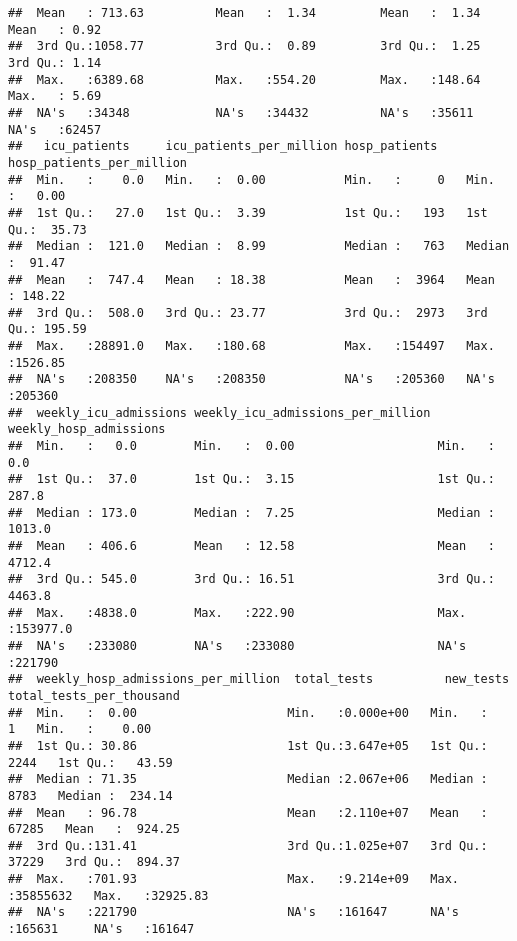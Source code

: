 \documentclass[
]{article}
\begin{document}
\begin{verbatim}
##  Mean   : 713.63          Mean   :  1.34         Mean   :  1.34                  Mean   : 0.92    
##  3rd Qu.:1058.77          3rd Qu.:  0.89         3rd Qu.:  1.25                  3rd Qu.: 1.14    
##  Max.   :6389.68          Max.   :554.20         Max.   :148.64                  Max.   : 5.69    
##  NA's   :34348            NA's   :34432          NA's   :35611                   NA's   :62457    
##   icu_patients     icu_patients_per_million hosp_patients    hosp_patients_per_million
##  Min.   :    0.0   Min.   :  0.00           Min.   :     0   Min.   :   0.00          
##  1st Qu.:   27.0   1st Qu.:  3.39           1st Qu.:   193   1st Qu.:  35.73          
##  Median :  121.0   Median :  8.99           Median :   763   Median :  91.47          
##  Mean   :  747.4   Mean   : 18.38           Mean   :  3964   Mean   : 148.22          
##  3rd Qu.:  508.0   3rd Qu.: 23.77           3rd Qu.:  2973   3rd Qu.: 195.59          
##  Max.   :28891.0   Max.   :180.68           Max.   :154497   Max.   :1526.85          
##  NA's   :208350    NA's   :208350           NA's   :205360   NA's   :205360           
##  weekly_icu_admissions weekly_icu_admissions_per_million weekly_hosp_admissions
##  Min.   :   0.0        Min.   :  0.00                    Min.   :     0.0      
##  1st Qu.:  37.0        1st Qu.:  3.15                    1st Qu.:   287.8      
##  Median : 173.0        Median :  7.25                    Median :  1013.0      
##  Mean   : 406.6        Mean   : 12.58                    Mean   :  4712.4      
##  3rd Qu.: 545.0        3rd Qu.: 16.51                    3rd Qu.:  4463.8      
##  Max.   :4838.0        Max.   :222.90                    Max.   :153977.0      
##  NA's   :233080        NA's   :233080                    NA's   :221790        
##  weekly_hosp_admissions_per_million  total_tests          new_tests        total_tests_per_thousand
##  Min.   :  0.00                     Min.   :0.000e+00   Min.   :       1   Min.   :    0.00        
##  1st Qu.: 30.86                     1st Qu.:3.647e+05   1st Qu.:    2244   1st Qu.:   43.59        
##  Median : 71.35                     Median :2.067e+06   Median :    8783   Median :  234.14        
##  Mean   : 96.78                     Mean   :2.110e+07   Mean   :   67285   Mean   :  924.25        
##  3rd Qu.:131.41                     3rd Qu.:1.025e+07   3rd Qu.:   37229   3rd Qu.:  894.37        
##  Max.   :701.93                     Max.   :9.214e+09   Max.   :35855632   Max.   :32925.83        
##  NA's   :221790                     NA's   :161647      NA's   :165631     NA's   :161647          

\end{verbatim}
\end{document}
